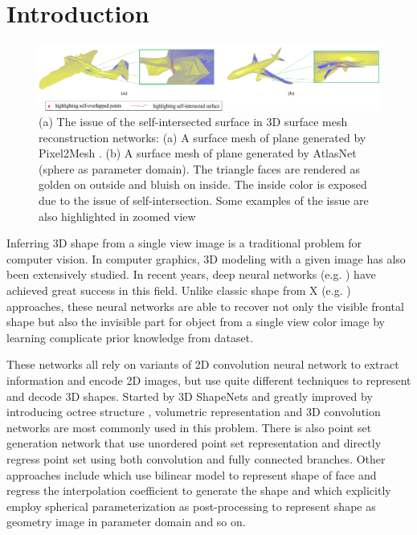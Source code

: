 \section{Introduction}
\begin{figure}[htbp]
	\centering
	\includegraphics[width=\linewidth]{img/issue/issue}
	\caption{(a) The issue of the self-intersected surface in 3D surface mesh reconstruction networks: (a) A surface mesh of plane generated by Pixel2Mesh \cite{pixel2mesh}. (b) A surface mesh of plane generated by AtlasNet \cite{atlasnet}(sphere as parameter domain). The triangle faces are rendered as golden on outside and bluish on inside. The inside color is exposed due to the issue of self-intersection. Some examples of the issue are also highlighted in zoomed view}
	\label{fig:issue}
\end{figure}
Inferring 3D shape from a single view image is a traditional problem for computer vision. In computer graphics, 3D modeling with a given image has also been extensively studied. In recent years, deep neural networks (e.g. \cite{3DR2N2,PSGN,3Drender,imgrecon15,3dshapenet,endface,octreegen,surfnet,shapeprior}) have achieved great success in this field. Unlike classic shape from X (e.g. \cite{shapefromshading,shapefromtext1,shapefromtext2}) approaches, these neural networks are able to recover not only the visible frontal shape but also the invisible part for object from a single view color image by learning complicate prior knowledge from dataset. 

These networks all rely on variants of 2D convolution neural network to extract information and encode 2D images, but use quite different techniques to represent and decode 3D shapes. Started by 3D ShapeNets \cite{3dshapenet} and greatly improved by introducing octree structure \cite{octreegen}, volumetric representation and 3D convolution networks are most commonly used in this problem. There is also point set generation network \cite{PSGN} that use unordered point set representation and directly regress point set using both convolution and fully connected branches. Other approaches include \cite{endface} which use bilinear model to represent shape of face and regress the interpolation coefficient to generate the shape and \cite{surfnet} which explicitly employ spherical parameterization as post-processing to represent shape as geometry image in parameter domain and so on.

